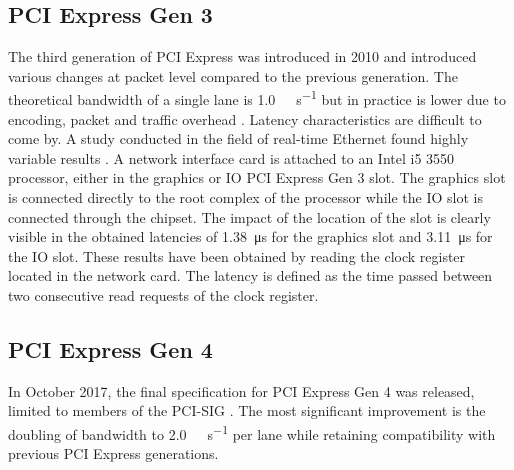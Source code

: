 


\subsection{PCI Express Gen 3}
\label{sec:pciegen3}
The third generation of PCI Express was introduced in 2010 \cite{pcie3} and introduced various changes at packet level compared to the previous generation. The theoretical bandwidth of a single lane is \SI{1.0}{\giga\byte\per\second} but in practice is lower due to encoding, packet and traffic overhead \cite{pcie-xilinx}. Latency characteristics are difficult to come by. A study conducted in the field of real-time Ethernet found highly variable results \cite{pcie-killer}. A network interface card is attached to an Intel i5 3550 processor, either in the graphics or IO PCI Express Gen 3 slot. The graphics slot is connected directly to the root complex of the processor while the IO slot is connected through the chipset. The impact of the location of the slot is clearly visible in the obtained latencies of \SI{1.38}{\micro\second} for the graphics slot and \SI{3.11}{\micro\second} for the IO slot. These results have been obtained by reading the clock register located in the network card. The latency is defined as the time passed between two consecutive read requests of the clock register.




\subsection{PCI Express Gen 4}
In October 2017, the final specification for PCI Express Gen 4 was released, limited to members of the PCI-SIG \cite{pcie4}. The most significant improvement is the doubling of bandwidth to \SI{2.0}{\giga\byte\per\second} per lane while retaining compatibility with previous PCI Express generations.




